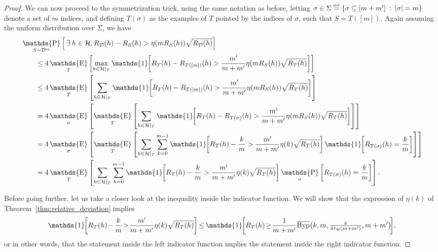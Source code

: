 \documentclass[twoside,11pt]{article}
\newcommand{\Id}[1]{\mathds{1}\hspace{-2.5pt}\left[#1\right]}
\let\oldexists=\exists
\renewcommand{\exists}{\hspace{1pt}\oldexists\hspace{1pt}}
\newcommand{\abs}[1]{\left|#1\right|}
\newcommand{\D}{\mathcal{D}}
\renewcommand{\H}{{\mathcal{H}}}
\newcommand{\eqdef}{\overset{\smash{\mbox{\tiny \rm def}}}{=}}
\DeclareMathOperator*{\Prob}{\mathds{P}}
\newcommand{\prob}[2]{\Prob_{#1}\left[#2\right]}
\DeclareMathOperator*{\Expectation}{\mathds{E}}
\newcommand{\exv}[2]{\Expectation_{#1}\left[#2\right]}
\newcommand{\HypInv}{\overline{\textnormal{Hyp}}}
\begin{document}
\begin{proof}
We can now proceed to the symmetrization trick, using the same notation as before, letting $\sigma \in \Sigma \eqdef \{ \sigma \subseteq [m + m'] \: : \: \abs{\sigma} = m \}$ denote a set of $m$ indices, and defining $T(\sigma)$ as the examples of $T$ pointed by the indices of $\sigma$, such that $S=T([m])$.
Again assuming the uniform distribution over $\Sigma$, we have
\begin{align}
&\prob{S\sim\D^m}{\exists h \in \H, R_\D(h) - R_S(h) > \eta(m R_S(h)) \sqrt{R_\D(h)}}\nonumber\\
    &\hspace{20pt} \le 4 \exv{T}{\max_{h\in\H|_T} \Id{R_{T}(h) - R_{T([m])}(h) > \frac{m'}{m+m'} \eta(m R_S(h)) \sqrt{R_T(h)}} }\nonumber\\
    &\hspace{20pt} \le 4 \exv{T}{\sum_{h\in\H|_T} \Id{R_{T}(h) - R_{T([m])}(h) > \frac{m'}{m+m'} \eta(m R_S(h)) \sqrt{R_T(h)}} }\nonumber\\
    &\hspace{20pt} = 4 \exv{\sigma}{\exv{T}{\sum_{h\in\H|_T} \Id{R_{T}(h) - R_{T(\sigma)}(h) > \frac{m'}{m+m'} \eta(m R_S(h)) \sqrt{R_T(h)}} } }\nonumber\\
    &\hspace{20pt} = 4 \exv{\sigma}{\exv{T}{\sum_{h\in\H|_T} \sum_{k=0}^{m-1}\Id{R_{T}(h) - \frac{k}{m} > \frac{m'}{m+m'} \eta(k) \sqrt{R_T(h)}}\Id{ R_{T(\sigma)}(h) = \frac{k}{m}} } }\nonumber\\
    &\hspace{20pt} = 4 \exv{T}{\sum_{h\in\H|_T} \sum_{k=0}^{m-1}\Id{R_{T}(h) - \frac{k}{m} > \frac{m'}{m+m'} \eta(k) \sqrt{R_T(h)}} \prob{\sigma}{ R_{T(\sigma)}(h) = \frac{k}{m}} }.\label{eq:reldev5}
\end{align}

Before going further, let us take a closer look at the inequality inside the indicator function.
We will show that the expression of $\eta(k)$ of Theorem~\ref{thm:relative_deviation} implies
\begin{equation*}
    \Id{R_{T}(h)\hspace{-1pt} -\hspace{-1pt} \frac{k}{m} \!>\! \frac{m'}{m+m'} \eta(k) \sqrt{R_T(h)}}
    \hspace{-1pt}\le\hspace{-1pt} \Id{R_T(h) \!\ge\! \frac{1}{m+m'}\HypInv\big(k, m, \textstyle\frac{\delta}{4 \tau_\H(m + m')}, m + m'\big)\! }\!,
\end{equation*}
or in other words, that the statement inside the left indicator function implies the statement inside the right indicator function.


\end{proof}
\end{document}
